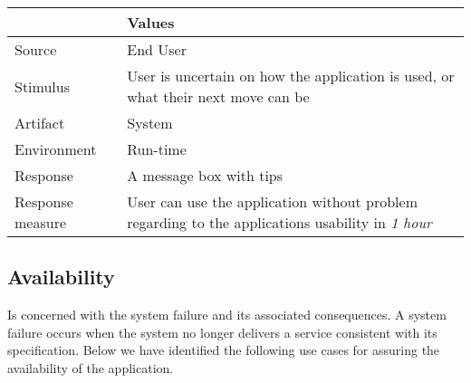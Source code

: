 \begin{itemize}
        \begin{tabular}{| l | p{7cm} |}
            \hline
            \rowcolor[gray]{0.8}
            \textbf{} & \textbf{Values} \\
            \hline
            Source & End User \\
            Stimulus & User is uncertain on how the application is used, or what their next move can be \\
            Artifact & System \\
            Environment & Run-time \\
            Response & A message box with tips \\
            Response measure  & User can use the application without problem regarding to the applications usability in \emph{1 hour}\\
            \hline
        \end{tabular}
\end{itemize}

\subsection{Availability}
Is concerned with the system failure and its associated consequences. A system failure occurs when the system no longer delivers a service consistent with its specification\citep{ProgarkPensum}. Below we have identified the following use cases for assuring the availability of the application.


